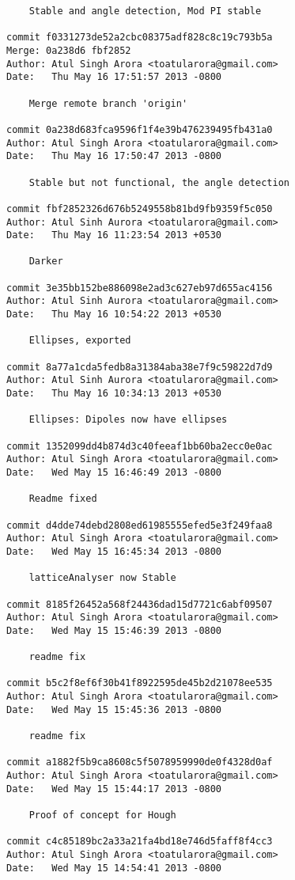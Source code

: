 \begin{lstlisting}
    Stable and angle detection, Mod PI stable

commit f0331273de52a2cbc08375adf828c8c19c793b5a
Merge: 0a238d6 fbf2852
Author: Atul Singh Arora <toatularora@gmail.com>
Date:   Thu May 16 17:51:57 2013 -0800

    Merge remote branch 'origin'

commit 0a238d683fca9596f1f4e39b476239495fb431a0
Author: Atul Singh Arora <toatularora@gmail.com>
Date:   Thu May 16 17:50:47 2013 -0800

    Stable but not functional, the angle detection

commit fbf2852326d676b5249558b81bd9fb9359f5c050
Author: Atul Sinh Aurora <toatularora@gmail.com>
Date:   Thu May 16 11:23:54 2013 +0530

    Darker

commit 3e35bb152be886098e2ad3c627eb97d655ac4156
Author: Atul Sinh Aurora <toatularora@gmail.com>
Date:   Thu May 16 10:54:22 2013 +0530

    Ellipses, exported

commit 8a77a1cda5fedb8a31384aba38e7f9c59822d7d9
Author: Atul Sinh Aurora <toatularora@gmail.com>
Date:   Thu May 16 10:34:13 2013 +0530

    Ellipses: Dipoles now have ellipses

commit 1352099dd4b874d3c40feeaf1bb60ba2ecc0e0ac
Author: Atul Singh Arora <toatularora@gmail.com>
Date:   Wed May 15 16:46:49 2013 -0800

    Readme fixed

commit d4dde74debd2808ed61985555efed5e3f249faa8
Author: Atul Singh Arora <toatularora@gmail.com>
Date:   Wed May 15 16:45:34 2013 -0800

    latticeAnalyser now Stable

commit 8185f26452a568f24436dad15d7721c6abf09507
Author: Atul Singh Arora <toatularora@gmail.com>
Date:   Wed May 15 15:46:39 2013 -0800

    readme fix

commit b5c2f8ef6f30b41f8922595de45b2d21078ee535
Author: Atul Singh Arora <toatularora@gmail.com>
Date:   Wed May 15 15:45:36 2013 -0800

    readme fix

commit a1882f5b9ca8608c5f5078959990de0f4328d0af
Author: Atul Singh Arora <toatularora@gmail.com>
Date:   Wed May 15 15:44:17 2013 -0800

    Proof of concept for Hough

commit c4c85189bc2a33a21fa4bd18e746d5faff8f4cc3
Author: Atul Singh Arora <toatularora@gmail.com>
Date:   Wed May 15 14:54:41 2013 -0800


\end{lstlisting}
